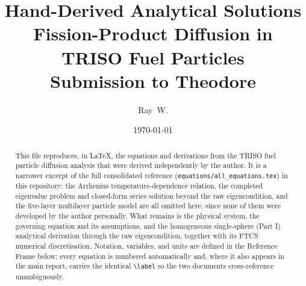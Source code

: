 \documentclass[11pt,a4paper]{article}
\title{\bfseries Hand-Derived Analytical Solutions\\[0.3em]
\large Fission-Product Diffusion in TRISO Fuel Particles\\[0.3em]
\normalsize Submission to Theodore}
\author{Ray~W.}
\date{\today}
\begin{document}
\maketitle
\begin{abstract}
This file reproduces, in LaTeX, the equations and derivations from the TRISO
fuel particle diffusion analysis that were derived independently by the
author. It is a narrower excerpt of the full consolidated reference
(\texttt{equations/all\_equations.tex}) in this repository: the Arrhenius
temperature-dependence relation, the completed eigenvalue problem and
closed-form series solution beyond the raw eigencondition, and the
five-layer multilayer particle model are all omitted here, since none of
them were developed by the author personally. What remains is the physical
system, the governing equation and its assumptions, and the homogeneous
single-sphere (Part I) analytical derivation through the raw eigencondition,
together with its FTCS numerical discretisation. Notation, variables, and
units are defined in the Reference Frame below; every equation is numbered
automatically and, where it also appears in the main report, carries the
identical \texttt{\textbackslash label} so the two documents cross-reference
unambiguously.
\end{abstract}
\tableofcontents
\clearpage
\end{document}
